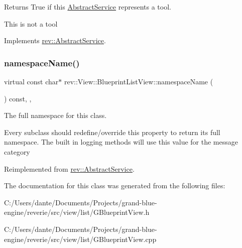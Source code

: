 Returns True if this \mbox{\hyperlink{classrev_1_1_abstract_service}{Abstract\+Service}} represents a tool. 

This is not a tool 

Implements \mbox{\hyperlink{classrev_1_1_abstract_service_aeb245a6d33601ccb842f4c7c2a3dda7a}{rev\+::\+Abstract\+Service}}.

\mbox{\label{classrev_1_1_view_1_1_blueprint_list_view_af706f0869b486cbe80ef9457723c9de6}} 
\subsubsection{\texorpdfstring{namespaceName()}{namespaceName()}}
{\footnotesize\ttfamily virtual const char$\ast$ rev\+::\+View\+::\+Blueprint\+List\+View\+::namespace\+Name (\begin{DoxyParamCaption}{ }\end{DoxyParamCaption}) const\hspace{0.3cm}{\ttfamily [inline]}, {\ttfamily [override]}, {\ttfamily [virtual]}}



The full namespace for this class. 

Every subclass should redefine/override this property to return its full namespace. The built in logging methods will use this value for the message category 

Reimplemented from \mbox{\hyperlink{classrev_1_1_abstract_service_a062e932eaa2eab0109288f2b32e459f7}{rev\+::\+Abstract\+Service}}.



The documentation for this class was generated from the following files\+:\begin{DoxyCompactItemize}
\item 
C\+:/\+Users/dante/\+Documents/\+Projects/grand-\/blue-\/engine/reverie/src/view/list/G\+Blueprint\+View.\+h\item 
C\+:/\+Users/dante/\+Documents/\+Projects/grand-\/blue-\/engine/reverie/src/view/list/G\+Blueprint\+View.\+cpp\end{DoxyCompactItemize}
